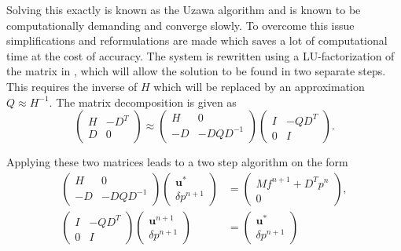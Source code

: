 Solving this exactly is known as the Uzawa algorithm and is known to be 
computationally demanding and converge slowly. To overcome this issue
simplifications and reformulations are made which saves a lot of computational time 
at the cost of accuracy.
The system is rewritten using a LU-factorization of the matrix in , 
which will allow the solution to be found in two separate steps. This 
requires the inverse of $H$ which will be replaced by an approximation $Q\approx H^{-1}$.
The matrix decomposition is given as
%
\begin{equation}
\begin{pmatrix}
    H & -D^T \\ 
    D & 0
\end{pmatrix}
\approx
\begin{pmatrix}
    H & 0 \\ 
    -D & -DQD^{-1}
\end{pmatrix}
\begin{pmatrix}
    I & -QD^T \\ 
    0 & I
\end{pmatrix}.
    \label{eq:LUfactorization}
\end{equation}
%

Applying these two matrices leads to a two step algorithm on the form 
\begin{align}
\begin{pmatrix}
    H & 0 \\ 
    -D & -DQD^{-1}
\end{pmatrix}
\begin{pmatrix}
    \mathbf{u}^{*}  \\ 
    \delta p^{n+1} 
\end{pmatrix}
&=
\begin{pmatrix}
    Mf^{n+1} +D^Tp^n  \\ 
    0 
    \end{pmatrix}
    \label{eq:PCstep1}
    ,\\
\begin{pmatrix}
    I & -QD^T \\ 
    0 & I
\end{pmatrix}
\begin{pmatrix}
    \mathbf{u}^{n+1}  \\ 
    \delta p^{n+1} 
\end{pmatrix}
&=
\begin{pmatrix}
    \mathbf{u}^{*}  \\ 
    \delta p^{n+1} 
\end{pmatrix}
    \label{eq:PCstep2}
\end{align}

